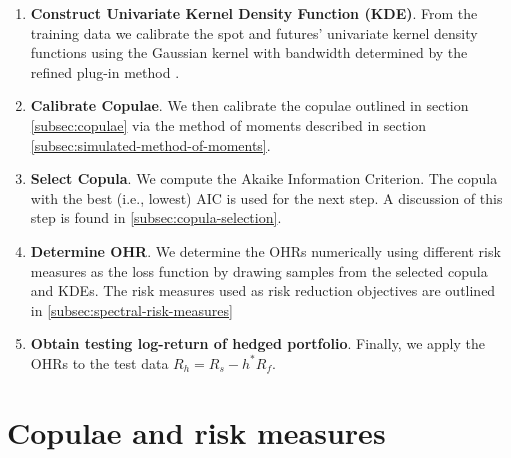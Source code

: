 \begin{enumerate}
\item \textbf{Construct Univariate Kernel Density Function (KDE)}.
  From the training data we calibrate the spot and futures'
  univariate kernel density functions using the Gaussian kernel with
  bandwidth determined by the refined plug-in method \citep[section
  3.3.3]{hardle2004nonparametric}.
\item \textbf{Calibrate Copulae}.
  We then calibrate the copulae outlined in section \ref{subsec:copulae} via the
  method of moments described in section \ref{subsec:simulated-method-of-moments}.
\item \textbf{Select Copula}.
  We compute the Akaike Information Criterion. The copula with the
  best (i.e., lowest) AIC is used for the next step. 
  A discussion of this step is found in \ref{subsec:copula-selection}.
\item \textbf{Determine OHR}.
  We determine the OHRs numerically using different risk measures as
  the loss function by drawing samples from the selected copula and
  KDEs. The risk measures used as risk reduction objectives are
  outlined in \ref{subsec:spectral-risk-measures} 
  \item \textbf{Obtain testing log-return of hedged portfolio}.
  Finally, we apply the OHRs to the test data $R_h = R_s - h^* R_f$.
  \end{enumerate}

\section{Copulae and risk measures}\label{sec:crm}










%

